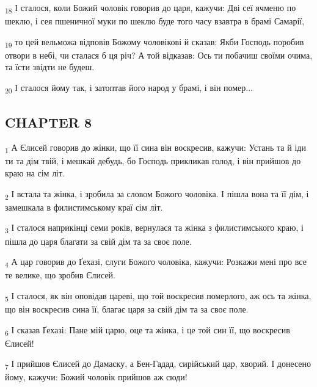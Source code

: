 \begin{tcolorbox}
\textsubscript{18} І сталося, коли Божий чоловік говорив до царя, кажучи: Дві сеї ячменю по шеклю, і сея пшеничної муки по шеклю буде того часу взавтра в брамі Самарії,
\end{tcolorbox}
\begin{tcolorbox}
\textsubscript{19} то цей вельможа відповів Божому чоловікові й сказав: Якби Господь поробив отвори в небі, чи сталася б ця річ? А той відказав: Ось ти побачиш своїми очима, та їсти звідти не будеш.
\end{tcolorbox}
\begin{tcolorbox}
\textsubscript{20} І сталося йому так, і затоптав його народ у брамі, і він помер...
\end{tcolorbox}
\subsection{CHAPTER 8}
\begin{tcolorbox}
\textsubscript{1} А Єлисей говорив до жінки, що її сина він воскресив, кажучи: Устань та й іди ти та дім твій, і мешкай дебудь, бо Господь прикликав голод, і він прийшов до краю на сім літ.
\end{tcolorbox}
\begin{tcolorbox}
\textsubscript{2} І встала та жінка, і зробила за словом Божого чоловіка. І пішла вона та її дім, і замешкала в филистимському краї сім літ.
\end{tcolorbox}
\begin{tcolorbox}
\textsubscript{3} І сталося наприкінці семи років, вернулася та жінка з филистимського краю, і пішла до царя благати за свій дім та за своє поле.
\end{tcolorbox}
\begin{tcolorbox}
\textsubscript{4} А цар говорив до Ґехазі, слуги Божого чоловіка, кажучи: Розкажи мені про все те велике, що зробив Єлисей.
\end{tcolorbox}
\begin{tcolorbox}
\textsubscript{5} І сталося, як він оповідав цареві, що той воскресив померлого, аж ось та жінка, що він воскресив сина її, благає царя за свій дім та за своє поле.
\end{tcolorbox}
\begin{tcolorbox}
\textsubscript{6} І сказав Ґехазі: Пане мій царю, оце та жінка, і це той син її, що воскресив Єлисей!
\end{tcolorbox}
\begin{tcolorbox}
\textsubscript{7} І прийшов Єлисей до Дамаску, а Бен-Гадад, сирійський цар, хворий. І донесено йому, кажучи: Божий чоловік прийшов аж сюди!
\end{tcolorbox}

